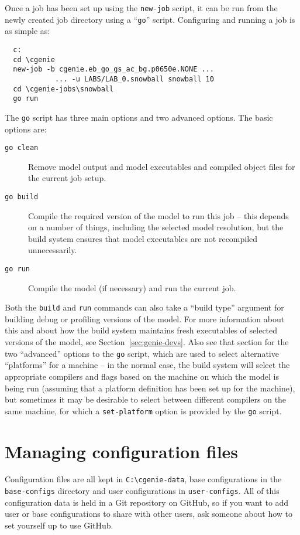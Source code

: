 \documentclass[a4paper,10pt,article]{memoir}
\begin{document}
Once a job has been set up using the \texttt{new-job} script, it can
be run from the newly created job directory using a ``\texttt{go}''
script.  Configuring and running a job is as simple as:
\begin{verbatim}
  c:
  cd \cgenie
  new-job -b cgenie.eb_go_gs_ac_bg.p0650e.NONE ...
            ... -u LABS/LAB_0.snowball snowball 10
  cd \cgenie-jobs\snowball
  go run
\end{verbatim}
The \texttt{go} script has three main options and two advanced
options.  The basic options are:
\begin{description}
  \item[\texttt{go clean}]{Remove model output and model executables
    and compiled object files for the current job setup.}
  \item[\texttt{go build}]{Compile the required version of the model
    to run this job -- this depends on a number of things, including
    the selected model resolution, but the build system ensures that
    model executables are not recompiled unnecessarily.}
  \item[\texttt{go run}]{Compile the model (if necessary) and run
    the current job.}
\end{description}
Both the \texttt{build} and \texttt{run} commands can also take a
``build type'' argument for building debug or profiling versions of
the model.  For more information about this and about how the build
system maintains fresh executables of selected versions of the model,
see Section~\ref{sec:genie-devs}.  Also see that section for the two
``advanced'' options to the \texttt{go} script, which are used to
select alternative ``platforms'' for a machine -- in the normal case,
the build system will select the appropriate compilers and flags based
on the machine on which the model is being run (assuming that a
platform definition has been set up for the machine), but sometimes it
may be desirable to select between different compilers on the same
machine, for which a \texttt{set-platform} option is provided by the
\texttt{go} script.

\section{Managing configuration files}

Configuration files are all kept in
\texttt{C:\textbackslash{}cgenie-data}, base configurations in the
\texttt{base-configs} directory and user configurations in
\texttt{user-configs}.  All of this configuration data is held in a
Git repository on GitHub, so if you want to add user or base
configurations to share with other users, ask someone about how to set
yourself up to use GitHub.
\end{document}
